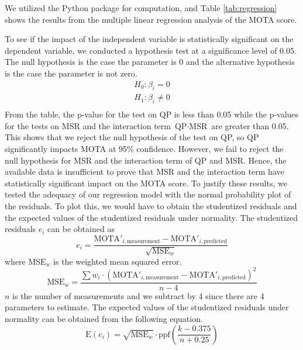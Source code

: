 We utilized the Python package \cite{seabold_statsmodels_2010} for computation, and Table \ref{tab:regression} shows the results from the multiple linear regression analysis of the MOTA score.

To see if the impact of the independent variable is statistically significant on the dependent variable, we conducted a hypothesis test at a significance level of 0.05. The null hypothesis is the case the parameter is 0 and the alternative hypothesis is the case the parameter is not zero.
\begin{equation}
    \begin{aligned}
        H_0: \beta_i = 0 \\
        H_1: \beta_i \neq 0 \\
    \end{aligned}
\end{equation}
From the table, the p-value for the test on QP is less than 0.05 while the p-values for the tests on MSR and the interaction term $\text{QP} \cdot \text{MSR}$ are greater than 0.05. This shows that we reject the null hypothesis of the test on QP, so QP significantly impacts MOTA at 95\% confidence. However, we fail to reject the null hypothesis for MSR and the interaction term of QP and MSR. Hence, the available data is insufficient to prove that MSR and the interaction term have statistically significant impact on the MOTA score. To justify these results, we tested the adequacy of our regression model with the normal probability plot of the residuals. To plot this, we would have to obtain the studentized residuals and the expected values of the studentized residuals under normality. The studentized residuals $e_i$ can be obtained as
\begin{equation}
    e_i = \frac{ \text{MOTA}'_{i,\text{measurement}} - \text{MOTA}'_{i,\text{predicted}} }{\sqrt{\text{MSE}_w}}
    \label{eqn:residuals}
\end{equation}
where $\text{MSE}_w$ is the weighted mean squared error.
\begin{equation}
    \text{MSE}_w = \frac{\sum w_i \cdot ( \text{MOTA}'_{i,\text{measurement}} - \text{MOTA}'_{i,\text{predicted}} )^2 }{n-4}
\end{equation}
$n$ is the number of measurements and we subtract by 4 since there are 4 parameters to estimate. The expected values of the studentized residuals under normality can be obtained from the following equation.
\begin{equation}
    \text{E}(e_i) = \sqrt{\text{MSE}_w} \cdot \text{ppf}( \frac{k - 0.375}{n + 0.25} )
\end{equation}
